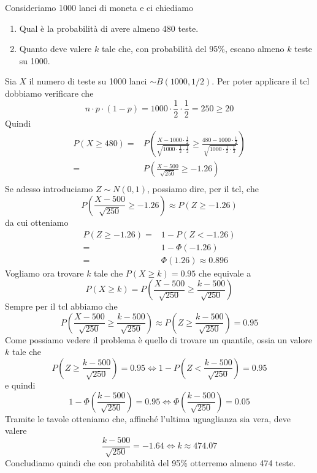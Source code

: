 \begin{example}
	Consideriamo 1000 lanci di moneta e ci chiediamo
	\begin{enumerate}
		\item Qual è la probabilità di avere almeno 480 teste.
		\item Quanto deve valere $k$ tale che, con probabilità del 95\%, escano almeno $k$ teste su
		      1000.
	\end{enumerate}
	Sia $X$ il numero di teste su 1000 lanci $\sim B(1000, 1/2)$. Per poter applicare il tcl
	dobbiamo verificare che
	\[ n \cdot p \cdot (1-p) = 1000 \cdot \frac{1}{2} \cdot \frac{1}{2} = 250 \geq 20 \]
	Quindi
	\begin{align*}
		P(X \geq 480) = & P \left( \frac{X - 1000 \cdot \frac{1}{2}}
		{\sqrt{1000 \cdot \frac{1}{2} \cdot \frac{1}{2}}} \geq
		\frac{480 - 1000 \cdot \frac{1}{2}}{\sqrt{1000 \cdot \frac{1}{2} \cdot \frac{1}{2}}}
		\right)                                                                  \\
		=               & P \left( \frac{X - 500}{\sqrt{250}} \geq -1.26 \right) \\
	\end{align*}
	Se adesso introduciamo $Z \sim N(0,1)$, possiamo dire, per il tcl, che
	\[
		P \left( \frac{X - 500}{\sqrt{250}}
		\geq -1.26 \right) \approx P(Z \geq -1.26)
	\]
	da cui otteniamo
	\begin{align*}
		P(Z \geq -1.26) = & 1 - P(Z < -1.26)         \\
		=                 & 1 - \Phi (-1.26)         \\
		=                 & \Phi(1.26) \approx 0.896
	\end{align*}
	Vogliamo ora trovare $k$ tale che $P(X \geq k) = 0.95$ che equivale a
	\[
		P(X \geq k) = P \left( \frac{X - 500}{\sqrt{250}} \geq \frac{k - 500}{\sqrt{250}} \right)
	\]
	Sempre per il tcl abbiamo che
	\[
		P \left( \frac{X - 500}{\sqrt{250}} \geq
		\frac{k - 500}{\sqrt{250}} \right) \approx
		P\left( Z \geq \frac{k - 500}{\sqrt{250}} \right) = 0.95
	\]
	Come possiamo vedere il problema è quello di trovare un quantile, ossia un valore $k$ tale che
	\[
		P \left( Z \geq \frac{k - 500}{\sqrt{250}} \right) = 0.95 \iff
		1 - P \left( Z < \frac{k - 500}{\sqrt{250}} \right) = 0.95
	\]
	e quindi
	\[
		1 - \Phi \left( \frac{k - 500}{\sqrt{250}} \right) = 0.95 \iff
		\Phi \left( \frac{k - 500}{\sqrt{250}} \right) = 0.05
	\]
	Tramite le tavole otteniamo che, affinché l'ultima uguaglianza sia vera, deve valere
	\[ \frac{k - 500}{\sqrt{250}} = -1.64 \iff k \approx 474.07 \]
	Concludiamo quindi che con probabilità del 95\% otterremo almeno 474 teste.
\end{example}

